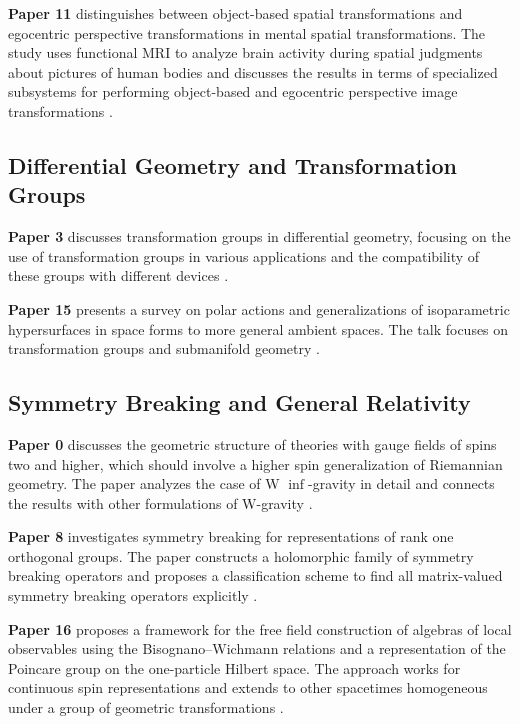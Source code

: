 \documentclass{article}
\begin{document}
\textbf{Paper 11} distinguishes between object-based spatial transformations and egocentric perspective transformations in mental spatial transformations. The study uses functional MRI to analyze brain activity during spatial judgments about pictures of human bodies and discusses the results in terms of specialized subsystems for performing object-based and egocentric perspective image transformations \cite{Zacks2002APS}.

\subsection{Differential Geometry and Transformation Groups}

\textbf{Paper 3} discusses transformation groups in differential geometry, focusing on the use of transformation groups in various applications and the compatibility of these groups with different devices \cite{Mueller2016TransformationGI}.

\textbf{Paper 15} presents a survey on polar actions and generalizations of isoparametric hypersurfaces in space forms to more general ambient spaces. The talk focuses on transformation groups and submanifold geometry \cite{Thorbergsson2005TransformationGA}.

\subsection{Symmetry Breaking and General Relativity}

\textbf{Paper 0} discusses the geometric structure of theories with gauge fields of spins two and higher, which should involve a higher spin generalization of Riemannian geometry. The paper analyzes the case of W $\inf$-gravity in detail and connects the results with other formulations of W-gravity \cite{Carroll2017Geometry}.

\textbf{Paper 8} investigates symmetry breaking for representations of rank one orthogonal groups. The paper constructs a holomorphic family of symmetry breaking operators and proposes a classification scheme to find all matrix-valued symmetry breaking operators explicitly \cite{Kobayashi2013SymmetryBF}.

\textbf{Paper 16} proposes a framework for the free field construction of algebras of local observables using the Bisognano–Wichmann relations and a representation of the Poincare group on the one-particle Hilbert space. The approach works for continuous spin representations and extends to other spacetimes homogeneous under a group of geometric transformations \cite{Brunetti2002ModularLA}.
\end{document}
